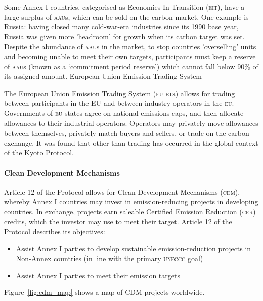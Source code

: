 Some Annex I countries, categorised as Economies In Transition (\textsc{eit}), have a large surplus of \textsc{aau}s, which can be sold on the carbon market. One example is Russia: having closed many cold-war-era industries since its 1990 base year, Russia was given more 'headroom' for growth when its carbon target was set. Despite the abundance of \textsc{aau}s in the market, to stop countries 'overselling' units and becoming unable to meet their own targets, participants must keep a reserve of \textsc{aau}s (known as a `commitment period reserve') which cannot fall below 90\% of its assigned amount.
European Union Emission Trading System

The European Union Emission Trading System (\textsc{eu ets}) allows for trading between participants in the EU and between industry operators in the \textsc{eu}. Governments of \textsc{eu} states agree on national emissions caps, and then allocate allowances to their industrial operators. Operators may privately move allowances between themselves, privately match buyers and sellers, or trade on the carbon exchange. It was found that other than trading has occurred in the global context of the Kyoto Protocol.~\cite{Grubb-09}

\paragraph{Clean Development Mechanisms}

Article 12 of the Protocol allows for Clean Development Mechanisms (\textsc{cdm}), whereby Annex I countries may invest in emission-reducing projects in developing countries. In exchange, projects earn saleable Certified Emission Reduction (\textsc{cer}) credits, which the investor may use to meet their target. Article 12 of the Protocol describes its objectives:

\begin{itemize}
	\item Assist Annex I parties to develop sustainable emission-reduction projects in Non-Annex countries (in line with the primary \textsc{unfccc} goal)
	\item Assist Annex I parties to meet their emission targets
\end{itemize}

Figure~\ref{fig:cdm_map} shows a map of CDM projects worldwide.

